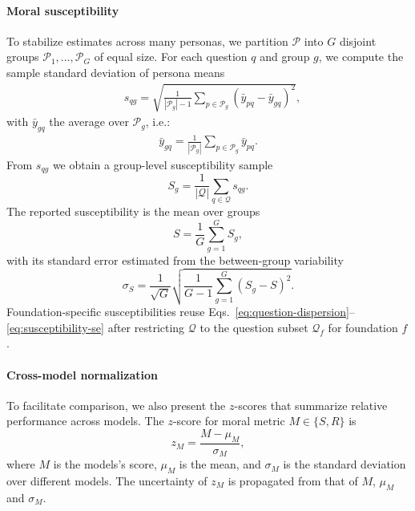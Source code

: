 \documentclass{article}
\begin{document}
\paragraph{Moral susceptibility} To stabilize estimates across many personas, we partition \(\mathcal{P}\) into \(G\) disjoint groups \(\mathcal{P}_1,\ldots,\mathcal{P}_G\) of equal size. For each question \(q\) and group \(g\), we compute the sample standard deviation of persona means
\begin{align}
  & s_{qg} = \sqrt{\frac{1}{|\mathcal{P}_g|-1} \sum_{p \in \mathcal{P}_g}(\bar{y}_{pq} - \bar{y}_{gq})^2},
  \label{eq:question-dispersion}
\end{align}
with $\bar{y}_{gq}$ the average over $\mathcal{P}_g$, i.e.: 
\begin{align}
  \bar{y}_{gq} = \frac{1}{|\mathcal{P}_g|} \sum_{p \in \mathcal{P}_g} \bar{y}_{pq}.
\end{align}
From $s_{qg}$ we obtain a group-level susceptibility sample
\begin{equation}
  S_g = \frac{1}{|\mathcal{Q}|} \sum_{q \in \mathcal{Q}} s_{qg}.\label{eq:group-susceptibility}
\end{equation}
The reported susceptibility is the mean over groups
\begin{equation}
  S = \frac{1}{G} \sum_{g=1}^{G} S_g,\label{eq:overall-susceptibility}
\end{equation}
with its standard error estimated from the between-group variability
\begin{equation}
  \sigma_S = \frac{1}{\sqrt{G}}\sqrt{\frac{1}{G-1} \sum_{g=1}^{G} (S_g - S)^2}.\label{eq:susceptibility-se}
\end{equation}
Foundation-specific susceptibilities reuse Eqs.~\eqref{eq:question-dispersion}--\eqref{eq:susceptibility-se} after restricting \(\mathcal{Q}\) to the question subset \(\mathcal{Q}_f\) for foundation \(f\).

\paragraph{Cross-model normalization} To facilitate comparison, we also present the $z$-scores that summarize relative performance across models. The $z$-score for moral metric $M\in \{S,R\}$ is
\begin{equation}
  z_{M} = \frac{M - \mu_M}{\sigma_M},
  \label{eq:zscore}
\end{equation}
where $M$ is the models's score, $\mu_M$ is the mean, and $\sigma_M$ is the standard deviation over different models. The uncertainty of $z_M$ is propagated from that of $M$, $\mu_M$ and $\sigma_M$.
\end{document}
